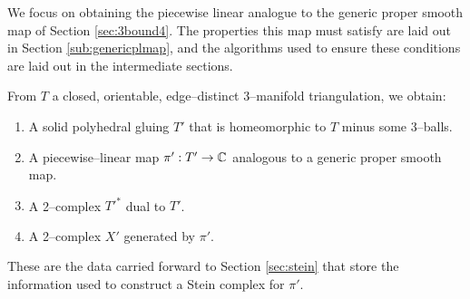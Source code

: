 We focus on obtaining the piecewise linear analogue to the generic proper smooth map of Section \ref{sec:3bound4}.
The properties this map must satisfy are laid out in Section \ref{sub:genericplmap}, and the algorithms used to ensure these conditions are laid out in the intermediate sections.

From $T$ a closed, orientable, edge--distinct 3--manifold triangulation, we obtain:
\begin{enumerate}
	\item A solid polyhedral gluing $T'$ that is homeomorphic to $T$ minus some 3--balls.
	\item A piecewise--linear map $\pi':T'\to\mathbb{C}$ analogous to a generic proper smooth map.
	\item A 2--complex $T'^*$ dual to $T'$.
	\item A 2--complex $X'$ generated by $\pi'$.
\end{enumerate}
These are the data carried forward to Section \ref{sec:stein} that store the information used to construct a Stein complex for $\pi'$.